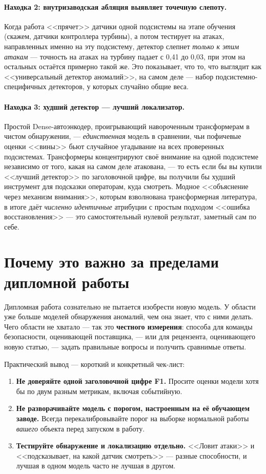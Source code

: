 \documentclass[11pt,a4paper]{article}
\begin{document}
\paragraph{Находка 2: внутризаводская абляция выявляет точечную слепоту.}
Когда работа <<прячет>> датчики одной подсистемы на этапе обучения (скажем, датчики контроллера турбины), а потом тестирует на атаках, направленных именно на эту подсистему, детектор слепнет \emph{только к этим атакам} --- точность на атаках на турбину падает с 0{,}41 до 0{,}03, при этом на остальных остаётся примерно такой же. Это показывает, что то, что выглядит как <<универсальный детектор аномалий>>, на самом деле --- набор подсистемно-специфичных детекторов, у которых случайно общие веса.

\paragraph{Находка 3: худший детектор --- лучший локализатор.}
Простой Dense-автоэнкодер, проигрывающий навороченным трансформерам в чистом обнаружении, --- \emph{единственная} модель в сравнении, чьи пофичевые оценки <<вины>> бьют случайное угадывание на всех проверенных подсистемах. Трансформеры концентрируют своё внимание на одной подсистеме независимо от того, какая на самом деле атакована, --- то есть если бы вы купили <<лучший детектор>> по заголовочной цифре, вы получили бы худший инструмент для подсказки операторам, куда смотреть. Модное <<объяснение через механизм внимания>>, которым взволнована трансформерная литература, в итоге даёт \emph{численно идентичные} атрибуции с простым подходом <<ошибка восстановления>> --- это самостоятельный нулевой результат, заметный сам по себе.

\section{Почему это важно за пределами дипломной работы}

Дипломная работа сознательно не пытается изобрести новую модель. У области уже больше моделей обнаружения аномалий, чем она знает, что с ними делать. Чего области не хватало --- так это \textbf{честного измерения}: способа для команды безопасности, оценивающей поставщика, --- или для рецензента, оценивающего новую статью, --- задать правильные вопросы и получить сравнимые ответы.

Практический вывод --- короткий и конкретный чек-лист:

\begin{enumerate}
  \item \textbf{Не доверяйте одной заголовочной цифре F1.} Просите оценки модели хотя бы по двум разным метрикам, включая событийную.
  \item \textbf{Не разворачивайте модель с порогом, настроенным на её обучающем заводе.} Всегда перекалибровывайте порог на выборке нормальной работы \emph{вашего} объекта перед запуском в работу.
  \item \textbf{Тестируйте обнаружение и локализацию отдельно.} <<Ловит атаки>> и <<подсказывает, на какой датчик смотреть>> --- разные способности, и лучшая в одном модель часто не лучшая в другом.
\end{enumerate}
\end{document}
